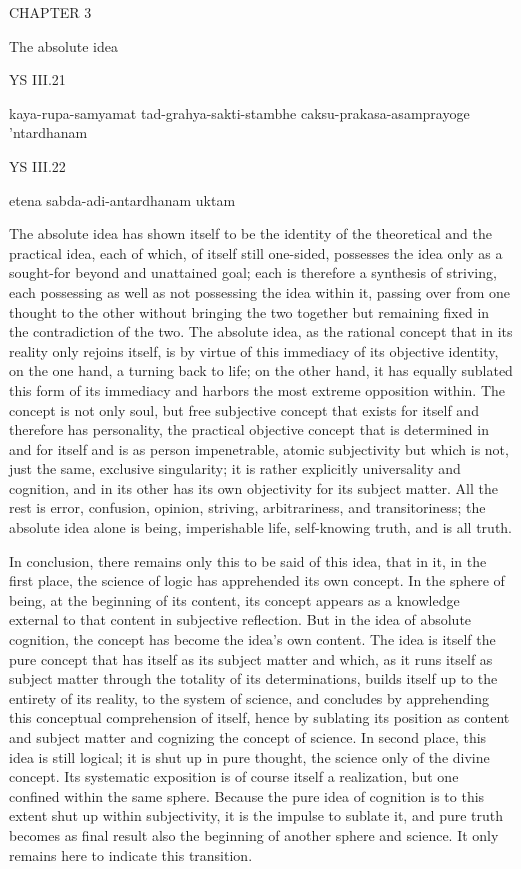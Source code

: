 CHAPTER 3

The absolute idea

YS III.21

    kaya-rupa-samyamat tad-grahya-sakti-stambhe caksu-prakasa-asamprayoge 'ntardhanam

YS III.22

    etena sabda-adi-antardhanam uktam

The absolute idea has shown itself to be
the identity of the theoretical and the practical idea,
each of which, of itself still one-sided, possesses the idea
only as a sought-for beyond and unattained goal;
each is therefore a synthesis of striving,
each possessing as well as not possessing the idea within it,
passing over from one thought to the other
without bringing the two together
but remaining fixed in the contradiction of the two.
The absolute idea, as the rational concept
that in its reality only rejoins itself,
is by virtue of this immediacy of its objective identity,
on the one hand, a turning back to life;
on the other hand, it has equally
sublated this form of its immediacy
and harbors the most extreme opposition within.
The concept is not only soul,
but free subjective concept
that exists for itself
and therefore has personality,
the practical objective concept
that is determined in and for itself
and is as person impenetrable, atomic subjectivity
but which is not, just the same, exclusive singularity;
it is rather explicitly universality and cognition,
and in its other has its own objectivity for its subject matter.
All the rest is error, confusion, opinion,
striving, arbitrariness, and transitoriness;
the absolute idea alone is being, imperishable life,
self-knowing truth, and is all truth.

In conclusion, there remains only this to be said of this idea,
that in it, in the first place,
the science of logic has apprehended its own concept.
In the sphere of being, at the beginning of its content,
its concept appears as a knowledge external to
that content in subjective reflection.
But in the idea of absolute cognition,
the concept has become the idea's own content.
The idea is itself the pure concept
that has itself as its subject matter
and which, as it runs itself as subject matter
through the totality of its determinations,
builds itself up to the entirety of its reality,
to the system of science,
and concludes by apprehending this
conceptual comprehension of itself,
hence by sublating its position
as content and subject matter
and cognizing the concept of science.
In second place, this idea is still logical;
it is shut up in pure thought,
the science only of the divine concept.
Its systematic exposition is of course itself a realization,
but one confined within the same sphere.
Because the pure idea of cognition is
to this extent shut up within subjectivity,
it is the impulse to sublate it,
and pure truth becomes as final result
also the beginning of another sphere and science.
It only remains here to indicate this transition.

